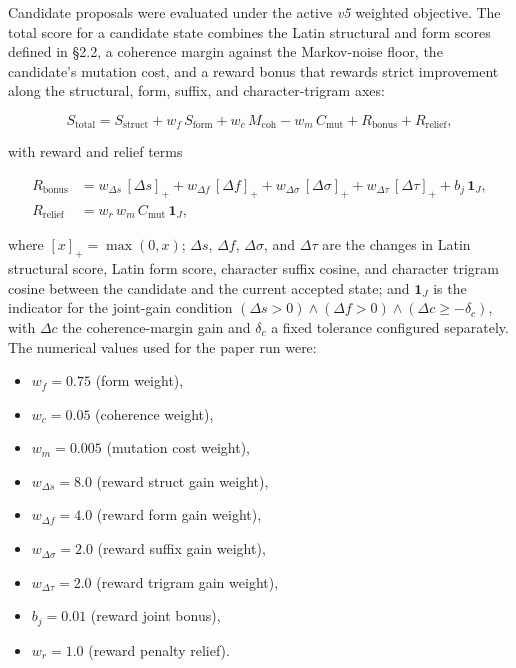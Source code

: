 \documentclass[11pt]{article}
\begin{document}
Candidate proposals were evaluated under the active \emph{v5} weighted
objective. The total score for a candidate state combines the Latin
structural and form scores defined in \S2.2, a coherence margin against
the Markov-noise floor, the candidate's mutation cost, and a reward bonus
that rewards strict improvement along the structural, form, suffix, and
character-trigram axes:

\begin{equation}
\label{eq:v5objective}
S_{\text{total}}
= S_{\text{struct}}
+ w_f\,S_{\text{form}}
+ w_c\,M_{\text{coh}}
- w_m\,C_{\text{mut}}
+ R_{\text{bonus}}
+ R_{\text{relief}},
\end{equation}

with reward and relief terms

\begin{align*}
R_{\text{bonus}}  &= w_{\Delta s}\,[\Delta s]_+
                  + w_{\Delta f}\,[\Delta f]_+
                  + w_{\Delta\sigma}\,[\Delta\sigma]_+
                  + w_{\Delta\tau}\,[\Delta\tau]_+
                  + b_j\,\mathbf{1}_J, \\
R_{\text{relief}} &= w_r\,w_m\,C_{\text{mut}}\,\mathbf{1}_J,
\end{align*}

where $[x]_+ = \max(0, x)$; $\Delta s$, $\Delta f$, $\Delta\sigma$, and
$\Delta\tau$ are the changes in Latin structural score, Latin form score,
character suffix cosine, and character trigram cosine between the candidate
and the current accepted state; and $\mathbf{1}_J$ is the indicator for the
joint-gain condition $(\Delta s > 0) \wedge (\Delta f > 0) \wedge
(\Delta c \geq -\delta_c)$, with $\Delta c$ the coherence-margin gain and
$\delta_c$ a fixed tolerance configured separately. The numerical values
used for the paper run were:

\begin{itemize}
    \item $w_f = 0.75$ (form weight),
    \item $w_c = 0.05$ (coherence weight),
    \item $w_m = 0.005$ (mutation cost weight),
    \item $w_{\Delta s} = 8.0$ (reward struct gain weight),
    \item $w_{\Delta f} = 4.0$ (reward form gain weight),
    \item $w_{\Delta\sigma} = 2.0$ (reward suffix gain weight),
    \item $w_{\Delta\tau} = 2.0$ (reward trigram gain weight),
    \item $b_j = 0.01$ (reward joint bonus),
    \item $w_r = 1.0$ (reward penalty relief).
\end{itemize}
\end{document}
